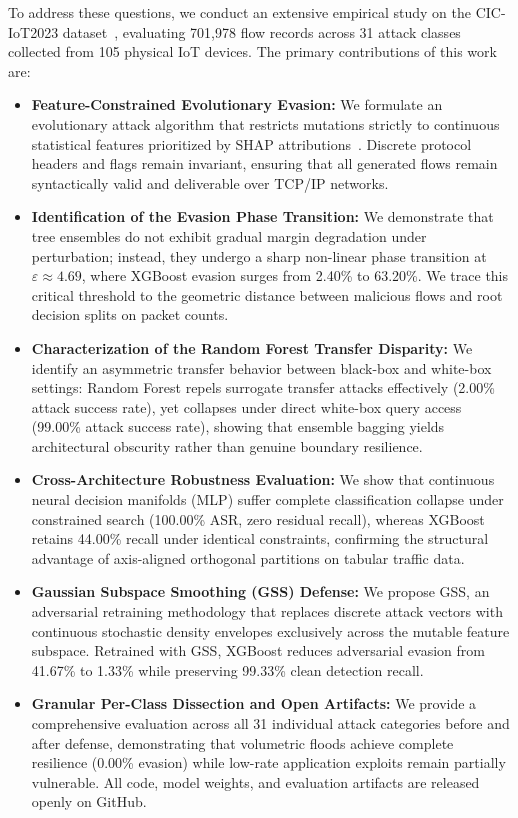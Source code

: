 \documentclass[final,5p,times,twocolumn]{elsarticle}
\begin{document}
To address these questions, we conduct an extensive empirical study on the CIC-IoT2023 dataset~\cite{neto2023ciciot2023}, evaluating 701,978 flow records across 31 attack classes collected from 105 physical IoT devices. The primary contributions of this work are:

\begin{itemize}
    \item \textbf{Feature-Constrained Evolutionary Evasion:} We formulate an evolutionary attack algorithm that restricts mutations strictly to continuous statistical features prioritized by SHAP attributions~\cite{lundberg2017shap}. Discrete protocol headers and flags remain invariant, ensuring that all generated flows remain syntactically valid and deliverable over TCP/IP networks.
    \item \textbf{Identification of the Evasion Phase Transition:} We demonstrate that tree ensembles do not exhibit gradual margin degradation under perturbation; instead, they undergo a sharp non-linear phase transition at $\varepsilon \approx 4.69$, where XGBoost evasion surges from 2.40\% to 63.20\%. We trace this critical threshold to the geometric distance between malicious flows and root decision splits on packet counts.
    \item \textbf{Characterization of the Random Forest Transfer Disparity:} We identify an asymmetric transfer behavior between black-box and white-box settings: Random Forest repels surrogate transfer attacks effectively (2.00\% attack success rate), yet collapses under direct white-box query access (99.00\% attack success rate), showing that ensemble bagging yields architectural obscurity rather than genuine boundary resilience.
    \item \textbf{Cross-Architecture Robustness Evaluation:} We show that continuous neural decision manifolds (MLP) suffer complete classification collapse under constrained search (100.00\% ASR, zero residual recall), whereas XGBoost retains 44.00\% recall under identical constraints, confirming the structural advantage of axis-aligned orthogonal partitions on tabular traffic data.
    \item \textbf{Gaussian Subspace Smoothing (GSS) Defense:} We propose GSS, an adversarial retraining methodology that replaces discrete attack vectors with continuous stochastic density envelopes exclusively across the mutable feature subspace. Retrained with GSS, XGBoost reduces adversarial evasion from 41.67\% to 1.33\% while preserving 99.33\% clean detection recall.
    \item \textbf{Granular Per-Class Dissection and Open Artifacts:} We provide a comprehensive evaluation across all 31 individual attack categories before and after defense, demonstrating that volumetric floods achieve complete resilience (0.00\% evasion) while low-rate application exploits remain partially vulnerable. All code, model weights, and evaluation artifacts are released openly on GitHub.
\end{itemize}
\end{document}
